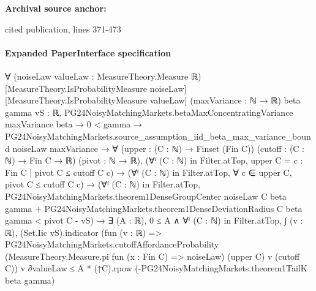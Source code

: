 \documentclass[10pt]{article}
\begin{document}
\textbf{Archival source anchor:} {\footnotesize\raggedright cited publication, lines 371-\allowbreak{}473\par}
\paragraph{Expanded PaperInterface specification}
\begin{ReviewVerbatim}
∀ (noiseLaw valueLaw : MeasureTheory.Measure ℝ) [MeasureTheory.IsProbabilityMeasure noiseLaw]
  [MeasureTheory.IsProbabilityMeasure valueLaw] (maxVariance : ℕ → ℝ) {beta gamma vS : ℝ},
  PG24NoisyMatchingMarkets.betaMaxConcentratingVariance maxVariance beta →
    0 < gamma →
      PG24NoisyMatchingMarkets.source_assumption_iid_beta_max_variance_bound noiseLaw maxVariance →
        ∀ (upper : (C : ℕ) → Finset (Fin C)) (cutoff : (C : ℕ) → Fin C → ℝ) (pivot : ℕ → ℝ),
          (∀ᶠ (C : ℕ) in Filter.atTop, upper C = {c : Fin C | pivot C ≤ cutoff C c}) →
            (∀ᶠ (C : ℕ) in Filter.atTop, ∀ c ∈ upper C, pivot C ≤ cutoff C c) →
              (∀ᶠ (C : ℕ) in Filter.atTop,
                  PG24NoisyMatchingMarkets.theorem1DenseGroupCenter noiseLaw C beta gamma +
                      PG24NoisyMatchingMarkets.theorem1DenseDeviationRadius C beta gamma <
                    pivot C - vS) →
                ∃ (A : ℝ),
                  0 ≤ A ∧
                    ∀ᶠ (C : ℕ) in Filter.atTop,
                      ∫ (v : ℝ),
                          (Set.Iic vS).indicator
                            (fun (v : ℝ) =>
                              PG24NoisyMatchingMarkets.cutoffAffordanceProbability
                                (MeasureTheory.Measure.pi fun (x : Fin C) => noiseLaw) (upper C) v (cutoff C))
                            v ∂valueLaw ≤
                        A * (↑C).rpow (-PG24NoisyMatchingMarkets.theorem1TailK beta gamma)
\end{ReviewVerbatim}
\end{document}
